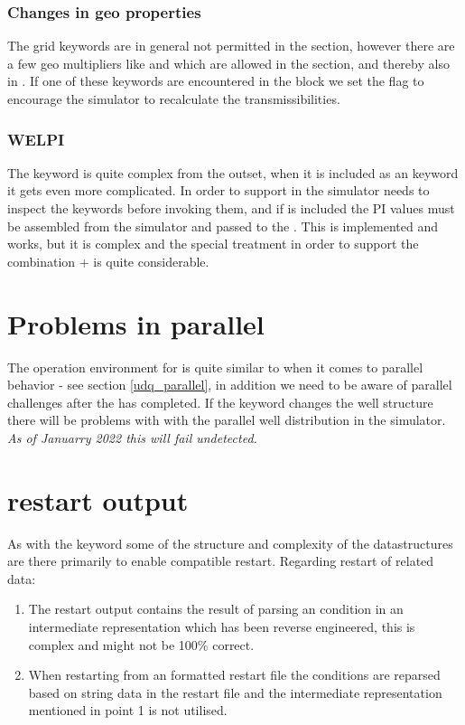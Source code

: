 \subsubsection{Changes in geo properties}
The grid keywords are in general not permitted in the  section,
however there are a few geo multipliers like  and  which
are allowed in the  section, and thereby also in \actionx{}. If one
of these keywords are encountered in the \actionx{} block we set the flag
 to encourage the
simulator to recalculate the transmissibilities.


\subsubsection{WELPI}
\label{actionx_welpi}
The  keyword is quite complex from the outset, when it is included as
an \actionx{} keyword it gets even more complicated. In order to support
 in \actionx{} the simulator needs to inspect the \actionx{} keywords
before invoking them, and if  is included the PI values must be
assembled from the simulator and passed to the
. This is implemented and works, but it is
complex and the special treatment in order to support the combination 
+ \actionx{} is quite considerable.


\section{Problems in parallel}
\label{actionx_paralle}
The operation environment for \actionx{} is quite similar to \udq{} when it
comes to parallel behavior - see section \ref{udq_parallel}, in addition we
need to be aware of parallel challenges after the \actionx{} has completed. If
the \actionx{} keyword changes the well structure there will be problems with
with the parallel well distribution in the simulator. \emph{As of Januarry 2022
this will fail undetected.}


\section{\actionx{} restart output}
As with the \udq{} keyword some of the structure and complexity of the
\actionx{} datastructures are there primarily to enable \eclipse{} compatible
restart. Regarding restart of \actionx{} related data:
\begin{enumerate}
  \item The restart output contains the result of parsing an \actionx{}
    condition in an intermediate representation which has been reverse
    engineered, this is complex and might not be 100\% correct.
  \item When restarting \flow{} from an \eclipse{} formatted restart file the
    \actionx{} conditions are reparsed based on string data in the restart file
    and the intermediate representation mentioned in point 1 is not utilised.
\end{enumerate}
